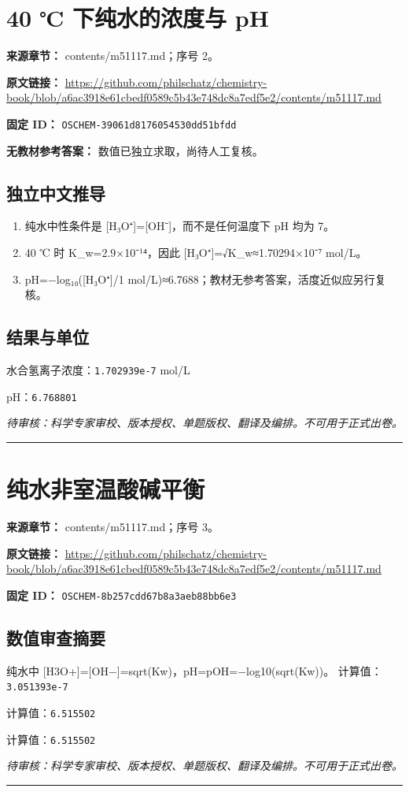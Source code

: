 \documentclass[UTF8,11pt,oneside,openany,fontset=none]{ctexbook}
\begin{document}
\section{40 ℃ 下纯水的浓度与 pH}
\noindent\textbf{来源章节：} contents/m51117.md；序号 2。\par
\noindent\textbf{原文链接：} \url{https://github.com/philschatz/chemistry-book/blob/a6ac3918e61cbedf0589c5b43e748dc8a7edf5e2/contents/m51117.md}\par
\noindent\textbf{固定 ID：} \texttt{OSCHEM-39061d8176054530dd51bfdd}\par
\textbf{无教材参考答案：} 数值已独立求取，尚待人工复核。\par
\subsection*{独立中文推导}
\begin{enumerate}
\item 纯水中性条件是 [H₃O⁺]=[OH⁻]，而不是任何温度下 pH 均为 7。
\item 40 ℃ 时 K\_w=2.9×10⁻¹⁴，因此 [H₃O⁺]=√K\_w≈1.70294×10⁻⁷ mol/L。
\item pH=−log₁₀([H₃O⁺]/1 mol/L)≈6.7688；教材无参考答案，活度近似应另行复核。
\end{enumerate}
\subsection*{结果与单位}
\noindent 水合氢离子浓度：\texttt{1.702939e-7} mol/L\par
\noindent pH：\texttt{6.768801} \par
\noindent\textit{待审核：科学专家审校、版本授权、单题版权、翻译及编排。不可用于正式出卷。}
\medskip\hrule\medskip
\section{纯水非室温酸碱平衡}
\noindent\textbf{来源章节：} contents/m51117.md；序号 3。\par
\noindent\textbf{原文链接：} \url{https://github.com/philschatz/chemistry-book/blob/a6ac3918e61cbedf0589c5b43e748dc8a7edf5e2/contents/m51117.md}\par
\noindent\textbf{固定 ID：} \texttt{OSCHEM-8b257cdd67b8a3aeb88bb6e3}\par
\subsection*{数值审查摘要}
纯水中 [H3O+]=[OH−]=sqrt(Kw)，pH=pOH=−log10(sqrt(Kw))。
\noindent 计算值：\texttt{3.051393e-7}\par
\noindent 计算值：\texttt{6.515502}\par
\noindent 计算值：\texttt{6.515502}\par
\noindent\textit{待审核：科学专家审校、版本授权、单题版权、翻译及编排。不可用于正式出卷。}
\medskip\hrule\medskip
\end{document}
